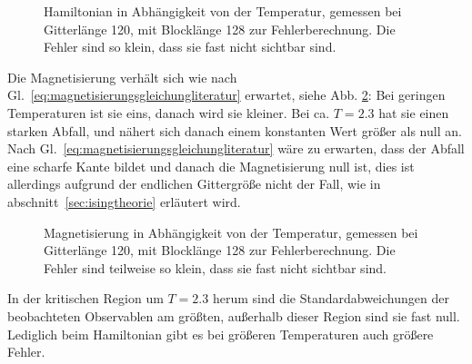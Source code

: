 	
	
	
	\begin{figure}[htbp]
		
		\caption[Hamiltonian in Abhängigkeit von der Temperatur]{Hamiltonian in Abhängigkeit von der Temperatur, gemessen bei Gitterlänge 120, mit Blocklänge 128 zur Fehlerberechnung. Die Fehler sind so klein, dass sie fast nicht sichtbar sind.}
		\label{fig:ergebnishamiltonian}
	\end{figure}
	

	Die Magnetisierung verhält sich wie nach Gl.~\ref{eq:magnetisierungsgleichungliteratur} erwartet, siehe Abb. \ref{fig:ergebnismagnetisierung}: Bei geringen Temperaturen ist sie eins, danach wird sie kleiner. Bei ca. $T=\num{2,3}$ hat sie einen starken Abfall, und nähert sich danach einem konstanten Wert größer als null an. Nach Gl.~\ref{eq:magnetisierungsgleichungliteratur} wäre zu erwarten, dass der Abfall eine scharfe Kante bildet und danach die Magnetisierung null ist, dies ist allerdings aufgrund der endlichen Gittergröße nicht der Fall, wie in abschnitt~\ref{sec:isingtheorie} erläutert wird.
	


	
	\begin{figure}[htbp]
		
		\caption[Magnetisierung in Abhängigkeit von der Temperatur]{Magnetisierung in Abhängigkeit von der Temperatur, gemessen bei Gitterlänge 120, mit Blocklänge 128 zur Fehlerberechnung. Die Fehler sind teilweise so klein, dass sie fast nicht sichtbar sind.}
		\label{fig:ergebnismagnetisierung}
	\end{figure}
	
	In der kritischen Region um $T=\num{2,3}$ herum sind die Standardabweichungen der beobachteten Observablen am größten, außerhalb dieser Region sind sie fast null. Lediglich beim Hamiltonian gibt es bei größeren Temperaturen auch größere Fehler. 
	
